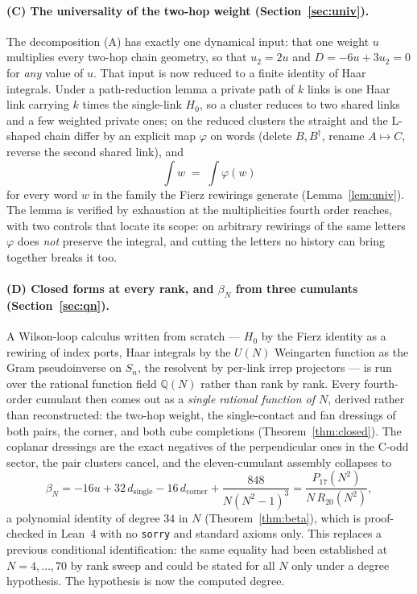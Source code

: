 \documentclass[11pt]{article}
\theoremstyle{definition}
\theoremstyle{remark}
\newcommand{\dg}{^{\dagger}}
\newcommand{\Q}{\mathbb{Q}}
\begin{document}
\paragraph{(C) The universality of the two-hop weight
(Section~\ref{sec:univ}).}
The decomposition (A) has exactly one dynamical input: that one weight $u$
multiplies every two-hop chain geometry, so that $u_2=2u$ and $D=-6u+3u_2=0$
for \emph{any} value of $u$. That input is now reduced to a finite identity of
Haar integrals. Under a path-reduction lemma a private path of $k$ links is one
Haar link carrying $k$ times the single-link $H_0$, so a cluster reduces to two
shared links and a few weighted private ones; on the reduced clusters the
straight and the L-shaped chain differ by an explicit map $\varphi$ on words
(delete $B,B\dg$, rename $A\mapsto C$, reverse the second shared link), and
\[
  \int w \;=\; \int\varphi(w)
\]
for every word $w$ in the family the Fierz rewirings generate
(Lemma~\ref{lem:univ}). The lemma is verified by exhaustion at the
multiplicities fourth order reaches, with two controls that locate its scope: on
arbitrary rewirings of the same letters $\varphi$ does \emph{not} preserve the
integral, and cutting the letters no history can bring together breaks it too.

\paragraph{(D) Closed forms at every rank, and $\beta_N$ from three cumulants
(Section~\ref{sec:qn}).}
A Wilson-loop calculus written from scratch --- $H_0$ by the Fierz identity as
a rewiring of index ports, Haar integrals by the $U(N)$ Weingarten function as
the Gram pseudoinverse on $S_n$, the resolvent by per-link irrep projectors ---
is run over the rational function field $\Q(N)$ rather than rank by rank. Every
fourth-order cumulant then comes out as a \emph{single rational function of
$N$}, derived rather than reconstructed: the two-hop weight, the single-contact
and fan dressings of both pairs, the corner, and both cube completions
(Theorem~\ref{thm:closed}). The coplanar dressings are the exact negatives of
the perpendicular ones in the C-odd sector, the pair clusters cancel, and the
eleven-cumulant assembly collapses to
\begin{equation}\label{eq:betaassembly}
  \beta_N=-16u+32\,d_{\mathrm{single}}-16\,d_{\mathrm{corner}}
          +\frac{848}{N(N^2-1)^3}
        =\frac{P_{17}(N^2)}{N\,R_{20}(N^2)} ,
\end{equation}
a polynomial identity of degree $34$ in $N$ (Theorem~\ref{thm:beta}), which is
proof-checked in Lean~4 with no \texttt{sorry} and standard axioms only. This
replaces a previous conditional identification: the same equality had been
established at $N=4,\dots,70$ by rank sweep and could be stated for all $N$
only under a degree hypothesis. The hypothesis is now the computed degree.
\end{document}
